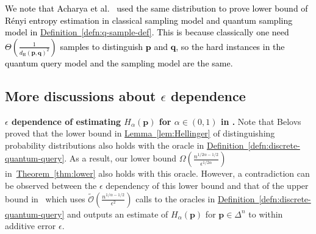 \documentclass[journal]{IEEEtran}
\newcommand{\thm}[1]{\hyperref[thm:#1]{Theorem~\ref*{thm:#1}}}
\newcommand{\defn}[1]{\hyperref[defn:#1]{Definition~\ref*{defn:#1}}}
\newcommand{\lem}[1]{\hyperref[lem:#1]{Lemma~\ref*{lem:#1}}}
\begin{document}
\textcolor{black}{We note that Acharya et al.~\cite{acharya2016estimating,acharya2019measuring} used the same distribution to prove lower bound of R{\'e}nyi entropy estimation in classical sampling model and quantum sampling model in \defn{q-sample-def}. This is because classically one need $\Theta(\frac{1}{d_{\mathrm{H}}(\mathbf{p},\mathbf{q})^2})$ samples to distinguish $\mathbf{p}$ and $\mathbf{q}$, so the hard instances in the quantum query model and the sampling model are the same. }

\subsection{More discussions about $\epsilon$ dependence}\label{sec:eps-dependence}
\noindent \textbf{$\epsilon$ dependence of estimating $H_{\alpha}(\mathbf{p})$ for $\alpha \in (0,1)$ in \cite{li2019entropy}.\quad}
Note that Belovs~\cite{belovs2019quantum} proved that the lower bound in \lem{Hellinger} of distinguishing probability distributions also holds with the oracle in \defn{discrete-quantum-query}. As a result, our lower bound $\Omega\left(\frac{n^{1/2\alpha-1/2}}{\epsilon^{1/2\alpha}}\right)$ in~\thm{lower} also holds with this oracle. However, a contradiction can be observed between the $\epsilon$ dependency of this lower bound and that of the upper bound in~\cite{li2019entropy} which uses $\widetilde{\mathcal{O}}\left(\frac{n^{1/\alpha-1/2}}{\epsilon^2}\right)$ calls to the oracles in \defn{discrete-quantum-query} and outputs an estimate of $H_{\alpha}(\mathbf{p})$ for $\mathbf{p}\in\Delta^n$ to within additive error $\epsilon$.
\end{document}
